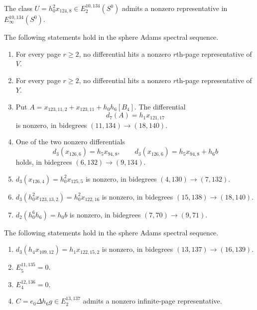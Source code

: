 \begin{theorem}
\label{frontier:AdamsCalculations:8f935e2bb066}
The class $U=h_0^2x_{124,8}\in E_2^{10,134}(S^0)$ admits a nonzero representative in $E_\infty^{10,134}(S^0)$.
\end{theorem}



\begin{theorem}
\label{frontier:AdamsCalculations:cd5b5345e83c}
The following statements hold in the sphere Adams spectral sequence.
\begin{enumerate}
\item For every page $r\geq2$, no differential hits a nonzero $r$th-page representative of $V$.
\item For every page $r\geq2$, no differential hits a nonzero $r$th-page representative of $Y$.
\item Put $A=x_{123,11,2}+x_{123,11}+h_0h_6[B_4]$. The differential
\[d_7(A)=h_1x_{121,17}\]
is nonzero, in bidegrees $(11,134)\longrightarrow(18,140)$.
\item One of the two nonzero differentials
\[d_3(x_{126,6})=h_5x_{94,8},\qquad d_3(x_{126,6})=h_5x_{94,8}+h_6b\]
holds, in bidegrees $(6,132)\longrightarrow(9,134)$.
\item $d_3(x_{126,4})=h_0^2x_{125,5}$ is nonzero, in bidegrees $(4,130)\longrightarrow(7,132)$.
\item $d_3(h_0^2x_{123,13,2})=h_0^2x_{122,16}$ is nonzero, in bidegrees $(15,138)\longrightarrow(18,140)$.
\item $d_2(h_0^6h_6)=h_0b$ is nonzero, in bidegrees $(7,70)\longrightarrow(9,71)$.
\end{enumerate}
\end{theorem}

\begin{theorem}
\label{frontier:AdamsCalculations:b90f6e551841}
The following statements hold in the sphere Adams spectral sequence.
\begin{enumerate}
\item $d_3(h_4x_{109,12})=h_1x_{122,15,2}$ is nonzero, in bidegrees $(13,137)\longrightarrow(16,139)$.
\item $E_5^{11,135}=0$.
\item $E_4^{12,136}=0$.
\item $C=e_0\Delta h_6g\in E_2^{13,137}$ admits a nonzero infinite-page representative.
\end{enumerate}
\end{theorem}

